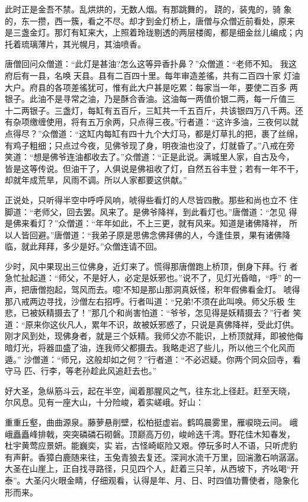 此时正是金吾不禁。乱烘烘的，无数人烟。有那跳舞的，跷的，装鬼的，骑
象的，东一攒，西一簇，看之不尽。却才到金灯桥上，唐僧与众僧近前看处，原来
是三盏金灯。那灯有缸来大，上照着玲珑剔透的两层楼阁，都是细金丝儿编成；内
托着琉璃薄片，其光幌月，其油喷香。

唐僧回问众僧道：“此灯是甚油?怎么这等异香扑鼻？”众僧道：“老师不知。
我这府后有一县，名唤天县。县有二百四十里。每年审造差徭，共有二百四十家
灯油大户。府县的各项差徭犹可，惟有此大户甚是吃累：每家当一年，要使二百多
两银子。此油不是寻常之油，乃是酥合香油。这油每一两值价银二两，每一斤值三
十二两银子。三盏灯，每缸有五百斤，三缸共一千五百斤，共该银四万八千两。还
有杂项缴缠使用，将有五万余两，只点得三夜。”行者道：“这许多油，三夜何以就
点得尽？”众僧道：“这缸内每缸有四十九个大灯马，都是灯草扎的把，裹了丝绵，
有鸡子粗细；只点过今夜，见佛爷现了身，明夜油也没了，灯就昏了。”八戒在旁
笑道：“想是佛爷连油都收去了。”众僧道：“正是此说。满城里人家，自古及今，
皆是这等传说。但油干了，人俱说是佛祖收了灯，自然五谷丰登；若有一年不干，
却就年成荒旱，风雨不调。所以人家都要这供献。”

正说处，只听得半空中呼呼风响，唬得些看灯的人尽皆四散。那些和尚也立不
住脚道：“老师父，回去罢。风来了。是佛爷降祥，到此看灯也。”唐僧道：“怎见
得是佛来看灯？”众僧道：“年年如此，不上三更，就有风来。知道是诸佛降祥，
所以人皆回避。”唐僧道：“我弟子原是思佛念佛拜佛的人，今逢佳景，果有诸佛降
临，就此拜拜，多少是好。”众僧连请不回。

少时，风中果现出三位佛身，近灯来了。慌得那唐僧跑上桥顶，倒身下拜。行
者急忙扯起道：“师父，不是好人，必定是妖邪也。”说不了，见灯光昏暗，“呼”
的一声，把唐僧抱起，驾风而去。噫!不知是那山那洞真妖怪，积年假佛看金灯。
唬得那八戒两边寻找，沙僧左右招呼。行者叫道：“兄弟!不须在此叫唤。师父乐极
生悲，已被妖精摄去了！”那几个和尚害怕道：“爷爷，怎见得是妖精摄去？”行者
笑道：“原来你这伙凡人，累年不识，故被妖邪惑了，只说是真佛降祥，受此灯供。
刚才风到处，现佛身者，就是三个妖精。我师父亦不能识，上桥顶就拜，即被他侮
暗灯光，将器皿盛了油，连我师父都摄去。我略走迟了些儿，所以他三个化风而遁。”
沙僧道：“师兄，这般却如之何？”行者道：“不必迟疑。你两个同众回寺，看守马
匹、行李，等老孙趁此风追赶去也。”

好大圣，急纵筋斗云，起在半空，闻着那腥风之气，往东北上径赶。赶至天晓，
尔风息。见有一座大山，十分险峻，着实嵯峨。好山：

重重丘壑，曲曲源泉。藤萝悬削壁，松柏挺虚岩。鹤鸣晨雾里，雁唳晓云间。
峨峨矗矗峰排戟，突突磷磷石砌磐。顶巅高万仞，峻岭迭千湾。野花佳木知春发，
杜宇黄莺应景妍。能巍奕，实岩，古怪崎岖险又艰。停玩多时人不语，只听虎豹
有声鼾。香獐白鹿随来往，玉兔青狼去复还。深涧水流千万里，回湍激石响潺潺。
大圣在山崖上，正自找寻路径，只见四个人，赶着三只羊，从西坡下，齐吆喝“开
泰”。大圣闪火眼金睛，仔细观看，认得是年、月、日、时四值功曹使者，隐象化
形而来。

